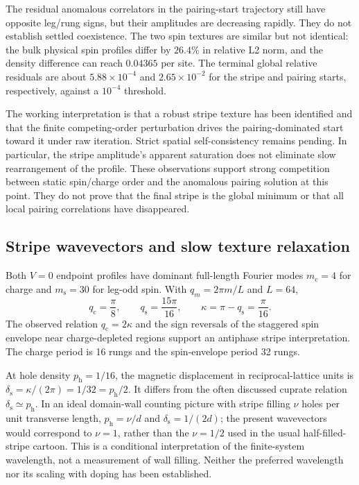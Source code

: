 \documentclass[11pt,letterpaper]{article}
\begin{document}
The residual anomalous correlators in the pairing-start trajectory still
have opposite leg/rung signs, but their amplitudes are decreasing rapidly.
They do not establish settled coexistence. The two spin textures are similar
but not identical: the bulk physical spin profiles differ by $26.4\%$ in
relative L2 norm, and the density difference can reach $0.04365$ per site.
The terminal global relative residuals are about $5.88\times10^{-4}$ and
$2.65\times10^{-2}$ for the stripe and pairing starts, respectively,
against a $10^{-4}$ threshold.

The working interpretation is that a robust stripe texture has been
identified and that the finite competing-order perturbation drives the
pairing-dominated start toward it under raw iteration. Strict spatial
self-consistency remains pending. In particular, the stripe amplitude's
apparent saturation does not eliminate slow rearrangement of the profile.
These observations support strong competition between static spin/charge
order and the anomalous pairing solution at this point. They do not prove
that the final stripe is the global minimum or that all local pairing
correlations have disappeared.

\subsection{Stripe wavevectors and slow texture relaxation}

Both $V=0$ endpoint profiles have dominant full-length Fourier modes
$m_{\mathrm c}=4$ for charge and $m_{\mathrm s}=30$ for leg-odd spin.
With $q_m=2\pi m/L$ and $L=64$,
\begin{equation}
 q_{\mathrm c}=\frac{\pi}{8},\qquad
 q_{\mathrm s}=\frac{15\pi}{16},\qquad
 \kappa=\pi-q_{\mathrm s}=\frac{\pi}{16}.
 \label{eq:observed-q}
\end{equation}
The observed relation $q_{\mathrm c}=2\kappa$ and the sign reversals of the
staggered spin envelope near charge-depleted regions support an antiphase
stripe interpretation. The charge period is 16 rungs and the spin-envelope
period 32 rungs.

At hole density $p_{\mathrm h}=1/16$, the magnetic displacement in
reciprocal-lattice units is $\delta_{\mathrm s}=\kappa/(2\pi)=1/32
=p_{\mathrm h}/2$. It differs from the often discussed cuprate relation
$\delta_{\mathrm s}\simeq p_{\mathrm h}$. In an ideal domain-wall counting
picture with stripe filling $\nu$ holes per unit transverse length,
$p_{\mathrm h}=\nu/d$ and $\delta_{\mathrm s}=1/(2d)$; the present
wavevectors would correspond to $\nu=1$, rather than the $\nu=1/2$ used
in the usual half-filled-stripe cartoon. This is a conditional interpretation
of the finite-system wavelength, not a measurement of wall filling.
Neither the preferred wavelength nor its scaling with doping has been
established.
\end{document}
